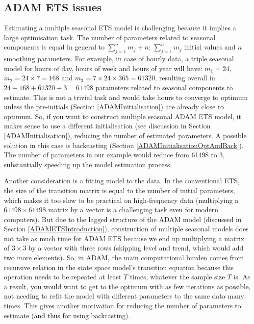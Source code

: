 \documentclass[
]{book}
\theoremstyle{definition}
\theoremstyle{definition}
\theoremstyle{definition}
\theoremstyle{definition}
\theoremstyle{remark}
\begin{document}
\hypertarget{adam-ets-issues}{%
\subsection{ADAM ETS issues}\label{adam-ets-issues}}

Estimating a multiple seasonal ETS model is challenging because it implies a large optimisation task. The number of parameters related to seasonal components is equal in general to \(\sum_{j=1}^n m_j + n\): \(\sum_{j=1}^n m_j\) initial values and \(n\) smoothing parameters. For example, in case of hourly data, a triple seasonal model for hours of day, hours of week and hours of year will have: \(m_1 = 24\), \(m_2 = 24 \times 7 = 168\) and \(m_3= 7 \times 24 \times 365 = 61320\), resulting overall in \(24 + 168 + 61320 + 3 = 61498\) parameters related to seasonal components to estimate. This is not a trivial task and would take hours to converge to optimum unless the pre-initials (Section \ref{ADAMInitialisation}) are already close to optimum. So, if you want to construct multiple seasonal ADAM ETS model, it makes sense to use a different initialisation (see discussion in Section \ref{ADAMInitialisation}), reducing the number of estimated parameters. A possible solution in this case is backcasting (Section \ref{ADAMInitialisationOptAndBack}). The number of parameters in our example would reduce from 61498 to 3, substantially speeding up the model estimation process.

Another consideration is a fitting model to the data. In the conventional ETS, the size of the transition matrix is equal to the number of initial parameters, which makes it too slow to be practical on high-frequency data (multiplying a \(61498 \times 61498\) matrix by a vector is a challenging task even for modern computers). But due to the lagged structure of the ADAM model (discussed in Section \ref{ADAMETSIntroduction}), construction of multiple seasonal models does not take as much time for ADAM ETS because we end up multiplying a matrix of \(3 \times 3\) by a vector with three rows (skipping level and trend, which would add two more elements). So, in ADAM, the main computational burden comes from recursive relation in the state space model's transition equation because this operation needs to be repeated at least \(T\) times, whatever the sample size \(T\) is. As a result, you would want to get to the optimum with as few iterations as possible, not needing to refit the model with different parameters to the same data many times. This gives another motivation for reducing the number of parameters to estimate (and thus for using backcasting).
\end{document}
